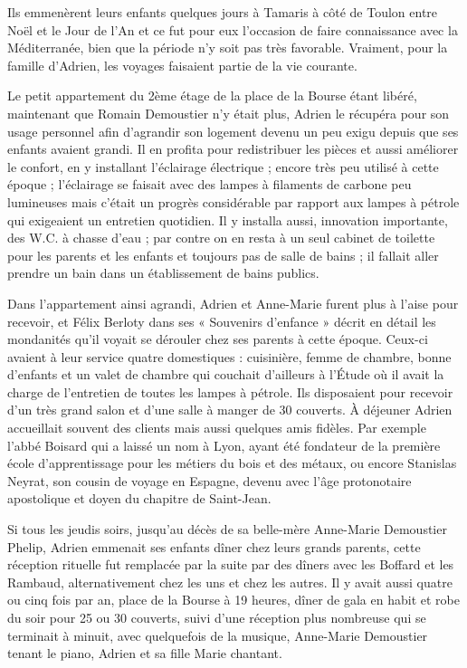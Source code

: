 \documentclass[11pt,a4paper]{report}
\begin{document}

Ils emmenèrent leurs enfants quelques jours à Tamaris à côté de Toulon entre Noël et le Jour de l'An et ce fut pour eux l'occasion de faire connaissance avec la Méditerranée, bien que la période n'y soit pas très favorable. Vraiment, pour la famille d'Adrien, les voyages faisaient partie de la vie courante.

Le petit appartement du 2ème étage de la place de la Bourse étant libéré, maintenant que Romain Demoustier n'y était plus, Adrien le récupéra pour son usage personnel afin d'agrandir son logement devenu un peu exigu depuis que ses enfants avaient grandi. Il en profita pour redistribuer les pièces et aussi améliorer le confort, en y installant l'éclairage électrique ; encore très peu utilisé à cette époque ; l'éclairage se faisait avec des lampes à filaments de carbone peu lumineuses mais c'était un progrès considérable par rapport aux lampes à pétrole qui exigeaient un entretien quotidien. Il y installa aussi, innovation importante, des W.C. à chasse d'eau ; par contre on en resta à un seul cabinet de toilette pour les parents et les enfants et toujours pas de salle de bains ; il fallait aller prendre un bain dans un établissement de bains publics.

Dans l'appartement ainsi agrandi, Adrien et Anne-Marie furent plus à l'aise pour recevoir, et Félix Berloty dans ses « Souvenirs d'enfance » décrit en détail les mondanités qu'il voyait se dérouler chez ses parents à cette époque. Ceux-ci avaient à leur service quatre domestiques : cuisinière, femme de chambre, bonne d'enfants et un valet de chambre qui couchait d'ailleurs à l'Étude où il avait la charge de l'entretien de toutes les lampes à pétrole. Ils disposaient pour recevoir d'un très grand salon et d'une salle à manger de 30 couverts. À déjeuner Adrien accueillait souvent des clients mais aussi quelques amis fidèles. Par exemple l'abbé Boisard qui a laissé un nom à Lyon, ayant été fondateur de la première école d'apprentissage pour les métiers du bois et des métaux, ou encore Stanislas Neyrat, son cousin de voyage en Espagne, devenu avec l'âge protonotaire apostolique et doyen du chapitre de Saint-Jean.

Si tous les jeudis soirs, jusqu'au décès de sa belle-mère Anne-Marie Demoustier Phelip, Adrien emmenait ses enfants dîner chez leurs grands parents, cette réception rituelle fut remplacée par la suite par des dîners avec les Boffard et les Rambaud, alternativement chez les uns et chez les autres. Il y avait aussi quatre ou cinq fois par an, place de la Bourse à 19 heures, dîner de gala en habit et robe du soir pour 25 ou 30 couverts, suivi d'une réception plus nombreuse qui se terminait à minuit, avec quelquefois de la musique, Anne-Marie Demoustier tenant le piano, Adrien et sa fille Marie chantant.
\end{document}
